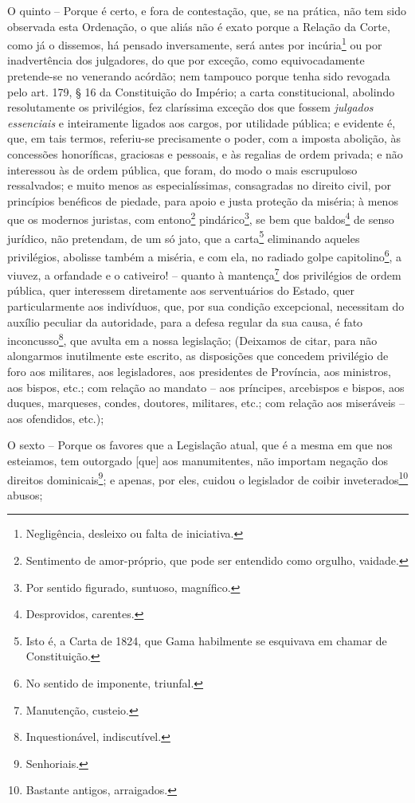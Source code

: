 O quinto -- Porque é certo, e fora de contestação, que, se na prática,
não tem sido observada esta Ordenação, o que aliás não é exato porque a
Relação da Corte, como já o dissemos, há pensado inversamente, será
antes por incúria\footnote{Negligência, desleixo ou falta de iniciativa.}
ou por inadvertência dos julgadores, do que por exceção, como
equivocadamente pretende-se no venerando acórdão; nem tampouco porque
tenha sido revogada pelo art. 179, § 16 da Constituição do Império; a
carta constitucional, abolindo resolutamente os privilégios, fez
claríssima exceção dos que fossem \emph{julgados essenciais} e
inteiramente ligados aos cargos, por utilidade pública; e evidente é,
que, em tais termos, referiu-se precisamente o poder, com a imposta
abolição, às concessões honoríficas, graciosas e pessoais, e às regalias
de ordem privada; e não interessou às de ordem pública, que foram, do
modo o mais escrupuloso ressalvados; e muito menos as especialíssimas,
consagradas no direito civil, por princípios benéficos de piedade, para
apoio e justa proteção da miséria; à menos que os modernos juristas, com
entono\footnote{Sentimento de amor-próprio, que pode ser entendido como
  orgulho, vaidade.} pindárico\footnote{Por sentido figurado, suntuoso,
  magnífico.}, se bem que baldos\footnote{Desprovidos, carentes.} de
senso jurídico, não pretendam, de um só jato, que a carta\footnote{Isto
  é, a Carta de 1824, que Gama habilmente se esquivava em chamar de
  Constituição.} eliminando aqueles privilégios, abolisse também a
miséria, e com ela, no radiado golpe capitolino\footnote{No sentido de
  imponente, triunfal.}, a viuvez, a orfandade e o cativeiro! -- quanto
à mantença\footnote{Manutenção, custeio.} dos privilégios de ordem
pública, quer interessem diretamente aos serventuários do Estado, quer
particularmente aos indivíduos, que, por sua condição excepcional,
necessitam do auxílio peculiar da autoridade, para a defesa regular da
sua causa, é fato inconcusso\footnote{Inquestionável, indiscutível.},
que avulta em a nossa legislação; (Deixamos de citar, para não
alongarmos inutilmente este escrito, as disposições que concedem
privilégio de foro aos militares, aos legisladores, aos presidentes de
Província, aos ministros, aos bispos, etc.; com relação ao mandato --
aos príncipes, arcebispos e bispos, aos duques, marqueses, condes,
doutores, militares, etc.; com relação aos miseráveis -- aos ofendidos,
etc.);

O sexto -- Porque os favores que a Legislação atual, que é a mesma em
que nos esteiamos, tem outorgado {[}que{]} aos manumitentes, não
importam negação dos direitos dominicais\footnote{Senhoriais.}; e
apenas, por eles, cuidou o legislador de coibir inveterados\footnote{Bastante
  antigos, arraigados.} abusos;

